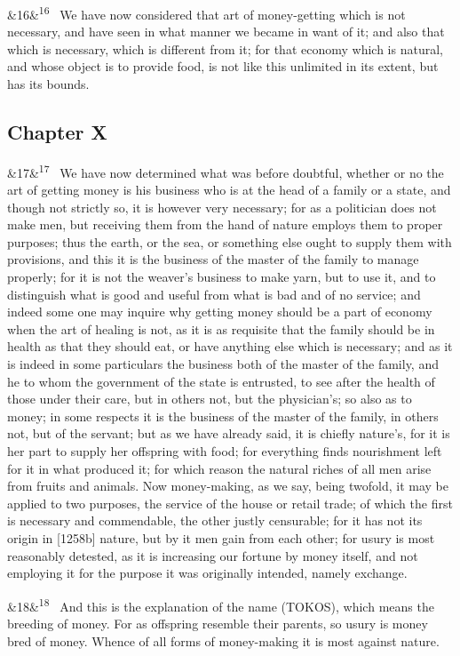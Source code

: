 \documentclass[12pt]{article}
\newcommand{\para}[1][]{\par\noindent\ifx&#1&\else\textsuperscript{\footnotesize #1}~\fi}
\begin{document}
\para[16] We have now considered that art of money-getting which is not necessary, and have seen in what manner we became in want of it; and also that which is necessary, which is different from it; for that economy which is natural, and whose object is to provide food, is not like this unlimited in its extent, but has its bounds.

\subsection*{Chapter X}

\para[17] We have now determined what was before doubtful, whether or no the art of getting money is his business who is at the head of a family or a state, and though not strictly so, it is however very necessary; for as a politician does not make men, but receiving them from the hand of nature employs them to proper purposes; thus the earth, or the sea, or something else ought to supply them with provisions, and this it is the business of the master of the family to manage properly; for it is not the weaver's business to make yarn, but to use it, and to distinguish what is good and useful from what is bad and of no service; and indeed some one may inquire why getting money should be a part of economy when the art of healing is not, as it is as requisite that the family should be in health as that they should eat, or have anything else which is necessary; and as it is indeed in some particulars the business both of the master of the family, and he to whom the government of the state is entrusted, to see after the health of those under their care, but in others not, but the physician's; so also as to money; in some respects it is the business of the master of the family, in others not, but of the servant; but as we have already said, it is chiefly nature's, for it is her part to supply her offspring with food; for everything finds nourishment left for it in what produced it; for which reason the natural riches of all men arise from fruits and animals. Now money-making, as we say, being twofold, it may be applied to two purposes, the service of the house or retail trade; of which the first is necessary and commendable, the other justly censurable; for it has not its origin in [1258b] nature, but by it men gain from each other; for usury is most reasonably detested, as it is increasing our fortune by money itself, and not employing it for the purpose it was originally intended, namely exchange.

\para[18] And this is the explanation of the name (TOKOS), which means the breeding of money. For as offspring resemble their parents, so usury is money bred of money. Whence of all forms of money-making it is most against nature.
\end{document}
